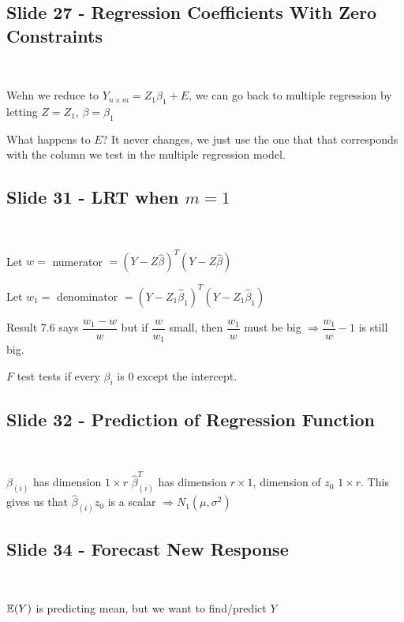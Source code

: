 \subsection{Slide 27 - Regression Coefficients With Zero Constraints}\hfill\\\par
\noindent Wehn we reduce to $Y_{n\times m} = Z_1\beta_1+E$, we can go back to multiple regression by letting $Z = Z_1$, $\beta = \beta_1$
\par\bigskip
\noindent What happens to $E$? It never changes, we just use the one that that corresponds with the column we test in the multiple regression model.
\par\bigskip
\subsection{Slide 31 - LRT when $m=1$}\hfill\\\par
\noindent Let $w = $ numerator $= (Y-Z\widehat{\beta})^T(Y-Z\widehat{\beta})$\par
\noindent Let $w_1 = $ denominator $ = (Y-Z_1\widehat{\beta}_1)^T(Y-Z_1\widehat{\beta}_1)$
\par\bigskip
\noindent Result 7.6 says $\dfrac{w_1-w}{w}$ but if $\dfrac{w}{w_1}$ small, then $\dfrac{w_1}{w}$ must be big $\Rightarrow \dfrac{w_1}{w}-1$ is still big.
\par\bigskip
\noindent $F$ test tests if every $\beta_i$ is 0 except the intercept.
\par\bigskip
\subsection{Slide 32 - Prediction of Regression Function}\hfill\\\par
\noindent $\beta_{(i)}$ has dimension $1\times r$ $\widehat{\beta}_{(i)}^T$ has dimension $r\times 1$, dimension of $z_0$ $1\times r$. This gives us that $\widehat{\beta}_{(i)}z_0$ is a scalar $\Rightarrow N_1(\mu,\sigma^2)$
\par\bigskip
\subsection{Slide 34 - Forecast New Response}\hfill\\\par
\noindent $\mathbb{E}(Y)$ is predicting mean, but we want to find/predict $Y$
